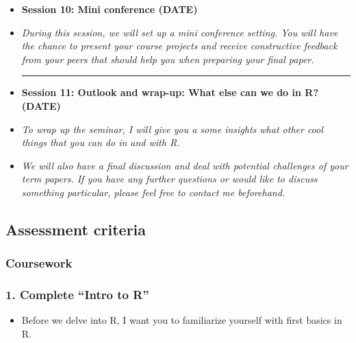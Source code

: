 \documentclass{article}
\begin{document}
\begin{itemize}
\noindent\rule{16cm}{0.7pt}
\vspace*{-0.45in}
\item[] \textbf{Session 10: Mini conference  (DATE)} 
\item[]\textit{During this session, we will set up a mini conference setting. You will have the chance to present your course projects and receive constructive feedback from your peers that should help you when preparing your final paper.}

\vspace*{0.04in}
\noindent\rule{16cm}{0.7pt}
\vspace*{-0.45in}
\item[] \textbf{Session 11: Outlook and wrap-up: What else can we do in \textsf{R}? (DATE)} 
\item[]\textit{To wrap up the seminar, I will give you a some insights what other cool  things that you can do in and with \textsf{R}.}
\item[] \textit{We will also have a final discussion and deal with potential challenges of your term papers. If you have any further questions or would like to discuss something particular, please feel free to contact me beforehand.}
\end{itemize}

\newpage


\subsection*{Assessment criteria}

\subsubsection*{Coursework}
\subsubsection*{1. Complete ``Intro to \textsf{R}''}
\begin{itemize}
\item[] Before we delve into \textsf{R}, I want you to familiarize yourself with first basics in \textsf{R}. 
\end{itemize}
\end{document}
